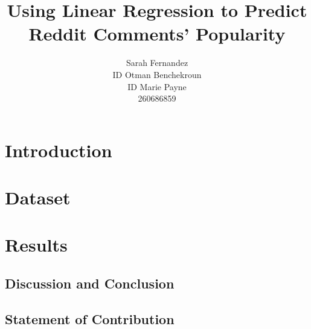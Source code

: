 \documentclass[11pt,letterpaper]{article}
\title{Using Linear Regression to Predict Reddit Comments' Popularity}
\author{Sarah Fernandez\\
	    ID
	  \And
	  Otman Benchekroun\\
	  ID
	  \And
	Marie Payne\\
  	260686859}
\date{}
\begin{document}
\maketitle

\begin{abstract}
 
 
\end{abstract}

\section{Introduction}


\section{Dataset}


\section{Results}


\subsection{Discussion and Conclusion}


\subsection{Statement of Contribution}




\end{document}
